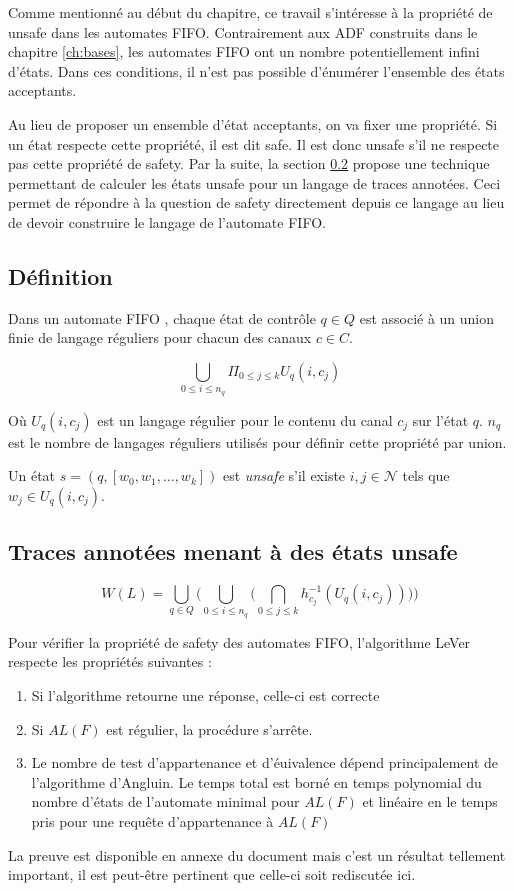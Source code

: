 Comme mentionné au début du chapitre, ce travail s'intéresse à la propriété de unsafe dans les automates FIFO. Contrairement aux ADF construits dans le chapitre \ref{ch:bases}, les automates FIFO ont un nombre potentiellement infini d'états. Dans ces conditions, il n'est pas possible d'énumérer l'ensemble des états acceptants.

Au lieu de proposer un ensemble d'état acceptants, on va fixer une propriété. Si un état respecte cette propriété, il est dit safe. Il est donc unsafe s'il ne respecte pas cette propriété de safety. Par la suite, la section \ref{ss:tracesafety} propose une technique permettant de calculer les états unsafe pour un langage de traces annotées. Ceci permet de répondre à la question de safety directement depuis ce langage au lieu de devoir construire le langage de l'automate FIFO.


\subsection{Définition}
Dans un automate FIFO \fifo, chaque état de contrôle $q\in Q$ est associé à un union finie de langage réguliers pour chacun des canaux $c\in C$.


$$\bigcup_{0 \leq i \leq n_q}\Pi_{0 \leq j \leq k}U_q(i,c_j)$$

Où $U_q(i,c_j)$ est un langage régulier pour le contenu du canal $c_j$ sur l'état $q$. $n_q$ est le nombre de langages réguliers utilisés pour définir cette propriété par union.

Un état $s=(q,[w_0,w_1,\dots,w_k])$ est \emph{unsafe} s'il existe $i,j \in \mathcal{N}$ tels que $w_j \in U_q(i,c_j)$.



\subsection{Traces annotées menant à des états unsafe}\label{ss:tracesafety}




$$
W(L)=\bigcup_{q\in Q}\big(\bigcup_{0\leq i\leq n_q}\big(\bigcap_{0\leq j \leq k}h_{c_j}^{-1}(U_q(i,c_j))\big)\big)
$$


\begin{theorem}
  Pour vérifier la propriété de safety des automates FIFO, l'algorithme LeVer respecte les propriétés suivantes :
  \begin{enumerate}
    \item Si l'algorithme retourne une réponse, celle-ci est correcte
    \item Si $AL(F)$ est régulier, la procédure s'arrête.
    \item Le nombre de test d'appartenance et d'éuivalence dépend principalement de l'algorithme d'Angluin. Le temps total est borné en temps polynomial du nombre d'états de l'automate minimal pour $AL(F)$ et linéaire en le temps pris pour une requête d'appartenance à $AL(F)$
  \end{enumerate}
\end{theorem}

La preuve est disponible en annexe du document \cite{Vardhan04} mais c'est un résultat tellement important, il est peut-être pertinent que celle-ci soit rediscutée ici.
